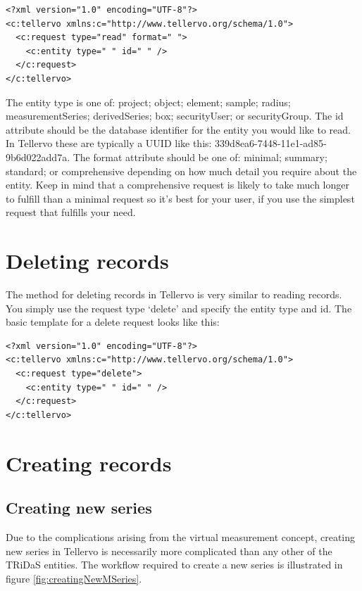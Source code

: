 \begin{lstlisting}
<?xml version="1.0" encoding="UTF-8"?>
<c:tellervo xmlns:c="http://www.tellervo.org/schema/1.0">
  <c:request type="read" format=" ">
    <c:entity type=" " id=" " />
  </c:request>
</c:tellervo>
\end{lstlisting}

The entity type is one of: project; object; element; sample; radius; measurementSeries; derivedSeries; box; securityUser; or securityGroup.  The id attribute should be the database identifier for the entity you would like to read.  In Tellervo these are typically a UUID like this: 339d8ea6-7448-11e1-ad85-9b6d022add7a.  The format attribute should be one of: minimal; summary; standard; or comprehensive depending on how much detail you require about the entity.  Keep in mind that a comprehensive request is likely to take much longer to fulfill than a minimal request so it's best for your user, if you use the simplest request that fulfills your need.


\section{Deleting records}

The method for deleting records in Tellervo is very similar to reading records.  You simply use the request type `delete' and specify the entity type and id.  The basic template for a delete request looks like this:

\begin{lstlisting}
<?xml version="1.0" encoding="UTF-8"?>
<c:tellervo xmlns:c="http://www.tellervo.org/schema/1.0">
  <c:request type="delete">
    <c:entity type=" " id=" " />
  </c:request>
</c:tellervo>
\end{lstlisting}



\section{Creating records}






\subsection{Creating new series}

Due to the complications arising from the virtual measurement concept, creating new series in Tellervo is necessarily more complicated than any other of the TRiDaS entities.  The workflow required to create a new series is illustrated in figure \ref{fig:creatingNewMSeries}.

